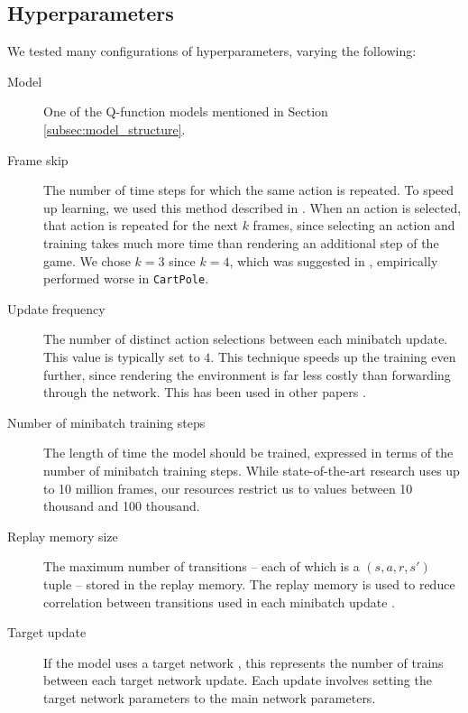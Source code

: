 \documentclass[11pt]{article}
\newcommand{\cp}{\texttt{CartPole}}
\begin{document}
\subsection{Hyperparameters}

We tested many configurations of hyperparameters, varying the following: 

\begin{description}
    \item[Model] One of the Q-function models mentioned in Section \ref{subsec:model_structure}.
    
    \item[Frame skip] The number of time steps for which the same action is repeated. To speed up learning, we used this method described in \cite{mnih2013playing, mnih2015human}. When an action is selected, that action is repeated for the next $k$ frames, since selecting an action and training takes much more time than rendering an additional step of the game. We chose $k = 3$ since $k = 4$, which was suggested in \cite{mnih2013playing, mnih2015human}, empirically performed worse in \cp. 
    
    \item[Update frequency] The number of distinct action selections between each minibatch update. This value is typically set to $4$. This technique speeds up the training even further, since rendering the environment is far less costly than forwarding through the network. This has been used in other papers \cite{mnih2013playing, mnih2015human, van2016deep}.
    
    \item[Number of minibatch training steps] The length of time the model should be trained, expressed in terms of the number of minibatch training steps. While state-of-the-art research uses up to 10 million frames, our resources restrict us to values between 10 thousand and 100 thousand.
    
    \item[Replay memory size] The maximum number of transitions -- each of which is a $(s, a, r, s')$ tuple -- stored in the replay memory. The replay memory is used to reduce correlation between transitions used in each minibatch update \cite{mnih2013playing, mnih2015human}.
    
    \item[Target update] If the model uses a target network \cite{mnih2015human}, this represents the number of trains between each target network update. Each update involves setting the target network parameters to the main network parameters.
    

\end{description}
\end{document}
